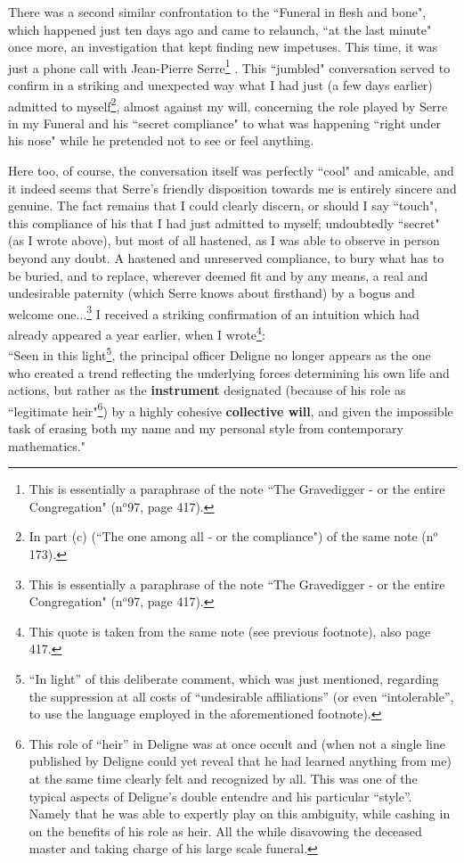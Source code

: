 There was a second similar confrontation to the ``Funeral in flesh and bone", which happened just ten days ago and came to relaunch, ``at the last minute" once more, an investigation that kept finding new impetuses. This time, it was just a phone call with Jean-Pierre Serre\footnote{This is essentially a paraphrase of the note ``The Gravedigger - or the entire Congregation" (n$^o$97, page 417).}
. This ``jumbled" conversation served to confirm in a striking and unexpected way what I had just (a few days earlier) admitted to myself\footnote{In part (c) (``The one among all - or the compliance") of the same note (n$^o$173).}, almost against my will, concerning the role played by Serre in my Funeral and his ``secret compliance" to what was happening ``right under his nose" while he pretended not to see or feel anything. 

Here too, of course, the conversation itself was perfectly ``cool" and amicable, and it indeed seems that Serre's friendly disposition towards me is entirely sincere and genuine. The fact remains that I could clearly discern, or should I say ``touch", this compliance of his that I had just admitted to myself; undoubtedly ``secret" (as I wrote above), but most of all hastened, as I was able to observe in person beyond any doubt. A hastened and unreserved compliance, to bury what has to be buried, and to replace, wherever deemed fit and by any means, a real and undesirable paternity (which Serre knows about firsthand) by a bogus and welcome one...\footnote{This is essentially a paraphrase of the note ``The Gravedigger - or the entire Congregation" (n$^o$97, page 417).} I received a striking confirmation of an intuition which had already appeared a year earlier, when I wrote\footnote{This quote is taken from the same note (see previous footnote), also page 417.}: \\

\parindent=0.6cm
``Seen in this light\footnote{``In light'' of this deliberate comment, which was just
mentioned, regarding the suppression at all costs of ``undesirable affiliations'' (or even
``intolerable'', to use the language employed in the aforementioned footnote).}, the
principal officer Deligne no longer appears as the one who created a trend reflecting the
underlying forces determining his own life and actions, but rather as the
\textbf{instrument} designated (because of his role as ``legitimate heir"\footnote{This
role of ``heir'' in Deligne was at once occult and (when not a single line published by
Deligne could yet reveal that he had learned anything from me) at the same time
clearly felt and recognized by all. This was one of the typical aspects of Deligne's double
entendre and his particular ``style''. Namely that he was able to expertly play on this
ambiguity, while cashing in on the benefits of his role as heir. All the while disavowing
the deceased master and taking charge of his large scale funeral.}) by a highly cohesive \textbf{collective will}, and given the impossible task of erasing both my name and my personal style from contemporary mathematics." \\

